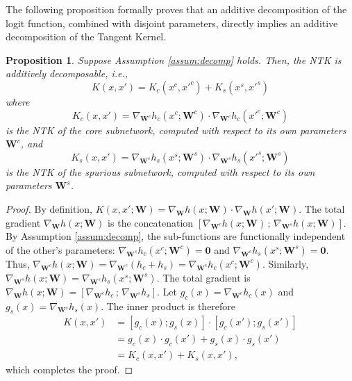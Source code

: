\documentclass[letter,11pt]{article}
\newtheorem{proposition}{Proposition}
\begin{document}
The following proposition formally proves that an additive decomposition of the logit function, combined with disjoint parameters, directly implies an additive decomposition of the Tangent Kernel.
\begin{proposition}\label{prop:decomp_kernel}
    Suppose Assumption \ref{assum:decomp} holds. Then, the NTK is additively decomposable, i.e., 
    \begin{equation}
        K(x, x') = K_c(x^c, x'^c) + K_s(x^s, x'^s)
    \end{equation}
     where 
     \begin{equation}
         K_c(x, x') = \nabla_{\mathbf{W}^c} h_c(x^c; \mathbf{W}^c) \cdot \nabla_{\mathbf{W}^c} h_c(x'^c; \mathbf{W}^c)
     \end{equation}
     is the NTK of the core subnetwork, computed with respect to its own parameters $\mathbf{W}^c$,
and  
\begin{equation}
    K_s(x, x') = \nabla_{\mathbf{W}^s} h_s(x^s; \mathbf{W}^s) \cdot \nabla_{\mathbf{W}^s} h_s(x'^s; \mathbf{W}^s)
\end{equation}
is the NTK of the spurious subnetwork, computed with respect to its own parameters $\mathbf{W}^s$.
\end{proposition}
\begin{proof}
    By definition, $K(x, x'; \mathbf{W}) = \nabla_\mathbf{W} h(x; \mathbf{W}) \cdot \nabla_\mathbf{W} h(x'; \mathbf{W})$. The total gradient $\nabla_\mathbf{W} h(x; \mathbf{W})$ is the concatenation $[\nabla_{\mathbf{W}^c} h(x; \mathbf{W}) \, ; \, \nabla_{\mathbf{W}^s} h(x; \mathbf{W})]$.
    By Assumption \ref{assum:decomp}, the sub-functions are functionally independent of the other's parameters: $\nabla_{\mathbf{W}^s} h_c(x^c; \mathbf{W}^c) = \mathbf{0}$ and $\nabla_{\mathbf{W}^c} h_s(x^s; \mathbf{W}^s) = \mathbf{0}$.
    Thus, $\nabla_{\mathbf{W}^c} h(x; \mathbf{W}) = \nabla_{\mathbf{W}^c} (h_c + h_s) = \nabla_{\mathbf{W}^c} h_c(x^c; \mathbf{W}^c)$.
    Similarly, $\nabla_{\mathbf{W}^s} h(x; \mathbf{W}) = \nabla_{\mathbf{W}^s} h_s(x^s; \mathbf{W}^s)$.
    The total gradient is $\nabla_\mathbf{W} h(x; \mathbf{W}) = [\nabla_{\mathbf{W}^c} h_c \, ; \, \nabla_{\mathbf{W}^s} h_s]$.
    Let $g_c(x) = \nabla_{\mathbf{W}^c} h_c(x)$ and $g_s(x) = \nabla_{\mathbf{W}^s} h_s(x)$. The inner product is therefore
    \begin{align*}
    K(x,x') 
      &= [g_c(x); g_s(x)] \cdot [g_c(x'); g_s(x')] \\
      &= g_c(x)\cdot g_c(x') + g_s(x)\cdot g_s(x') \\
      &= K_c(x,x') + K_s(x,x'),
    \end{align*}
    which completes the proof.
\end{proof}
\end{document}
